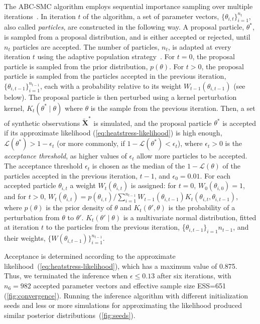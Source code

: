 \documentclass[12pt]{extarticle}
\let\vec\mathbf
\newcommand{\likelihood}{\mathcal{L}}
\begin{document}
The ABC-SMC algorithm employs sequential importance sampling over multiple iterations~\citep{Toni2009, Klinger2017, Syga2021}.
In iteration $t$ of the algorithm, a set of parameter vectors, $\{\theta_{i,t}\}_{i=1}^{n_t}$, also called \emph{particles}, are constructed in the following way.
A proposal particle, $\theta^*$, is sampled from a proposal distribution, and is either accepted or rejected, until $n_t$ particles are accepted.
The number of particles, $n_t$, is adapted at every iteration $t$ using the adaptive population strategy~\citep[\href{https://pyabc.readthedocs.io}{pyabc.readthedocs.io}]{Klinger2018}.
For $t=0$, the proposal particle is sampled from the prior distribution, $p(\theta)$.
For $t>0$, the proposal particle is sampled from the particles accepted in the previous iteration, $\{\theta_{i,t-1}\}_{i=1}^{n_{t-1}}$, each with a probability relative to its weight $W_{t-1}(\theta_{i,t-1})$ (see below). The proposal particle is then perturbed using a kernel perturbation kernel, $K_t(\theta^* \mid \theta)$ where $\theta$ is the sample from the previous iteration.
Then, a set of synthetic observations $\tilde{\vec X}^*$ is simulated, and the proposal particle $\theta^*$ is accepted if its approximate likelihood (\cref{eq:heatstress-likelihood}) is high enough, $\likelihood(\theta^*)>1-\epsilon_t$ (or more commonly, if $1-\likelihood(\theta^*) < \epsilon_t$), where $\epsilon_t>0$ is the \emph{acceptance threshold}, as higher values of $\epsilon_t$ allow more particles to be accepted. 
The acceptance threshold $\epsilon_t$ is chosen as the median of the $1-\likelihood(\theta)$ of the particles accepted in the previous iteration, $t-1$, and $\epsilon_0=0.01$. 
For each accepted particle $\theta_{i,t}$ a weight $W_t(\theta_{i,t})$ is assigned: for $t=0$, $W_0(\theta_{i,0})=1$, and for $t>0$, 
$W_t(\theta_{i,t}) = p(\theta_{i,t}) / \sum_{i=1}^{n_{t-1}}{W_{t-1}(\theta_{i,t-1}) K_t(\theta_{i,t}, \theta_{i,t-1})}$, where $p(\theta)$ is the prior density of $\theta$ and $K_t(\theta', \theta)$ is the probability of a perturbation from $\theta$ to $\theta'$.
$K_t(\theta' \mid \theta)$ is a multivariate normal distribution, fitted at iteration $t$ to the particles from the previous iteration, \{$\theta_{i,t-1}\}_{i=1}{n_{t-1}}$, and their weights, $\{W(\theta_{i,t-1})\}_{i=1}^{n_{t-1}}$.

Acceptance is determined according to the approximate likelihood~(\cref{eq:heatstress-likelihood}), which has a maximum value of 0.875. Thus, we terminated the inference when $\epsilon \le 0.13$ after six iterations, with $n_6=982$ accepted parameter vectors and effective sample size ESS=651 (\cref{fig:convergence}). %
Running the inference algorithm with different initialization seeds and less or more simulations for approximating the likelihood produced similar posterior distributions~(\cref{fig:seeds}). %
\end{document}
